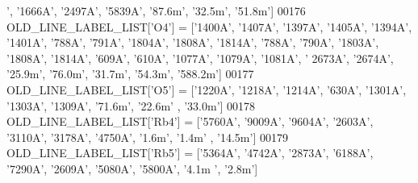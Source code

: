\begin{DoxyCode}
{{{      '}, \textcolor{stringliteral}{'1666A'}, \textcolor{stringliteral}{'2497A'}, \textcolor{stringliteral}{'5839A'}, \textcolor{stringliteral}{'87.6m'}, \textcolor{stringliteral}{'32.5m'}, \textcolor{stringliteral}{'51.8m'}]
00176 OLD\_LINE\_LABEL\_LIST[\textcolor{stringliteral}{'O4'}] = [\textcolor{stringliteral}{'1400A'}, \textcolor{stringliteral}{'1407A'}, \textcolor{stringliteral}{'1397A'}, \textcolor{stringliteral}{'1405A'}, \textcolor{stringliteral}{'1394A'}, \textcolor{stringliteral}{'1401A'}, \textcolor{stringliteral}{'788A'}, \textcolor{stringliteral}{'791A'}, \textcolor{stringliteral}{'1804A'},
       \textcolor{stringliteral}{'1808A'}, \textcolor{stringliteral}{'1814A'}, \textcolor{stringliteral}{'788A'}, \textcolor{stringliteral}{'790A'}, \textcolor{stringliteral}{'1803A'}, \textcolor{stringliteral}{'1808A'}, \textcolor{stringliteral}{'1814A'}, \textcolor{stringliteral}{'609A'}, \textcolor{stringliteral}{'610A'}, \textcolor{stringliteral}{'1077A'}, \textcolor{stringliteral}{'1079A'}, \textcolor{stringliteral}{'1081A'}, \textcolor{stringliteral}{'
      2673A'}, \textcolor{stringliteral}{'2674A'}, \textcolor{stringliteral}{'25.9m'}, \textcolor{stringliteral}{'76.0m'}, \textcolor{stringliteral}{'31.7m'}, \textcolor{stringliteral}{'54.3m'}, \textcolor{stringliteral}{'588.2m'}]
00177 OLD\_LINE\_LABEL\_LIST[\textcolor{stringliteral}{'O5'}] = [\textcolor{stringliteral}{'1220A'}, \textcolor{stringliteral}{'1218A'}, \textcolor{stringliteral}{'1214A'}, \textcolor{stringliteral}{'630A'}, \textcolor{stringliteral}{'1301A'}, \textcolor{stringliteral}{'1303A'}, \textcolor{stringliteral}{'1309A'}, \textcolor{stringliteral}{'71.6m'}, \textcolor{stringliteral}{'22.6m'}
      , \textcolor{stringliteral}{'33.0m'}]
00178 OLD\_LINE\_LABEL\_LIST[\textcolor{stringliteral}{'Rb4'}] = [\textcolor{stringliteral}{'5760A'}, \textcolor{stringliteral}{'9009A'}, \textcolor{stringliteral}{'9604A'}, \textcolor{stringliteral}{'2603A'}, \textcolor{stringliteral}{'3110A'}, \textcolor{stringliteral}{'3178A'}, \textcolor{stringliteral}{'4750A'}, \textcolor{stringliteral}{'1.6m'}, \textcolor{stringliteral}{'1.4m'}
      , \textcolor{stringliteral}{'14.5m'}]
00179 OLD\_LINE\_LABEL\_LIST[\textcolor{stringliteral}{'Rb5'}] = [\textcolor{stringliteral}{'5364A'}, \textcolor{stringliteral}{'4742A'}, \textcolor{stringliteral}{'2873A'}, \textcolor{stringliteral}{'6188A'}, \textcolor{stringliteral}{'7290A'}, \textcolor{stringliteral}{'2609A'}, \textcolor{stringliteral}{'5080A'}, \textcolor{stringliteral}{'5800A'}, \textcolor{stringliteral}{'4.1m
      '}, \textcolor{stringliteral}{'2.8m'}]
}}
\end{DoxyCode}
